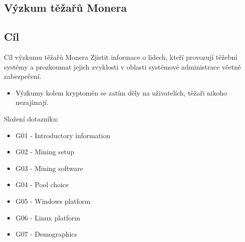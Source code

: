 \documentclass{beamer}
\begin{document}
  \begin{darkframes}
    \section{Výzkum těžařů Monera}
    \subsection{Cíl}
    \begin{frame}{Cíl výzkumu těžařů Monera}
Zjistit informace o lidech, kteří provozují těžební systémy a prozkoumat jejich zvyklosti v oblasti systémové administrace včetně zabezpečení.
\begin{itemize}
\item Výzkumy kolem kryptoměn se zatím děly na uživatelích, těžaři nikoho nezajímají.
\end{itemize}
Složení dotazníku:
\begin{itemize}
\item<1-4> G01 - Introductory information
\item<1-4> G02 - Mining setup
\item<1-4> G03 - Mining software
\item<2-4> G04 - Pool choice
\item<3-4> G05 - Windows platform
\item<3-4> G06 - Linux platform
\item<4-4> G07 - Demographics
\end{itemize}
    \end{frame}

\end{darkframes}
\end{document}
